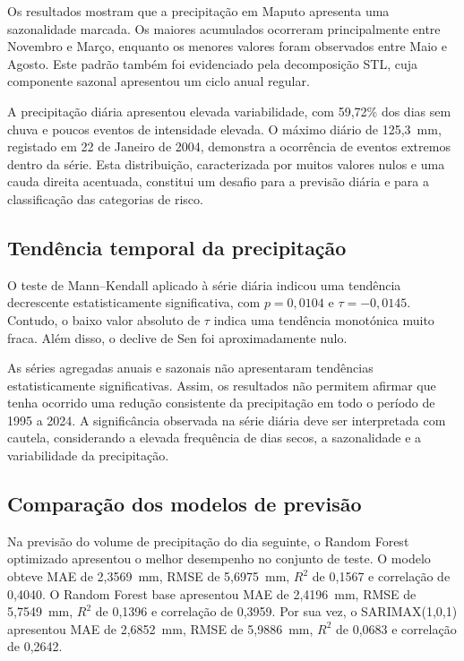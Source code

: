\documentclass[9pt,twocolumn,twoside,english,portuguese]{opticajnl}
\begin{document}
Os resultados mostram que a precipitação em Maputo apresenta uma sazonalidade
marcada. Os maiores acumulados ocorreram principalmente entre Novembro e
Março, enquanto os menores valores foram observados entre Maio e Agosto.
Este padrão também foi evidenciado pela decomposição STL, cuja componente
sazonal apresentou um ciclo anual regular.

A precipitação diária apresentou elevada variabilidade, com 59,72\% dos dias
sem chuva e poucos eventos de intensidade elevada. O máximo diário de
125,3~mm, registado em 22 de Janeiro de 2004, demonstra a ocorrência de
eventos extremos dentro da série. Esta distribuição, caracterizada por
muitos valores nulos e uma cauda direita acentuada, constitui um desafio
para a previsão diária e para a classificação das categorias de risco.

\subsection{Tendência temporal da precipitação}

O teste de Mann--Kendall aplicado à série diária indicou uma tendência
decrescente estatisticamente significativa, com $p=0{,}0104$ e
$\tau=-0{,}0145$. Contudo, o baixo valor absoluto de $\tau$ indica uma
tendência monotónica muito fraca. Além disso, o declive de Sen foi
aproximadamente nulo.

As séries agregadas anuais e sazonais não apresentaram tendências
estatisticamente significativas. Assim, os resultados não permitem afirmar
que tenha ocorrido uma redução consistente da precipitação em todo o
período de 1995 a 2024. A significância observada na série diária deve ser
interpretada com cautela, considerando a elevada frequência de dias secos,
a sazonalidade e a variabilidade da precipitação.


\subsection{Comparação dos modelos de previsão}

Na previsão do volume de precipitação do dia seguinte, o Random Forest
optimizado apresentou o melhor desempenho no conjunto de teste. O modelo
obteve MAE de 2,3569~mm, RMSE de 5,6975~mm, $R^2$ de 0,1567 e correlação de
0,4040. O Random Forest base apresentou MAE de 2,4196~mm, RMSE de
5,7549~mm, $R^2$ de 0,1396 e correlação de 0,3959. Por sua vez, o
SARIMAX(1,0,1) apresentou MAE de 2,6852~mm, RMSE de 5,9886~mm, $R^2$ de
0,0683 e correlação de 0,2642.
\end{document}
